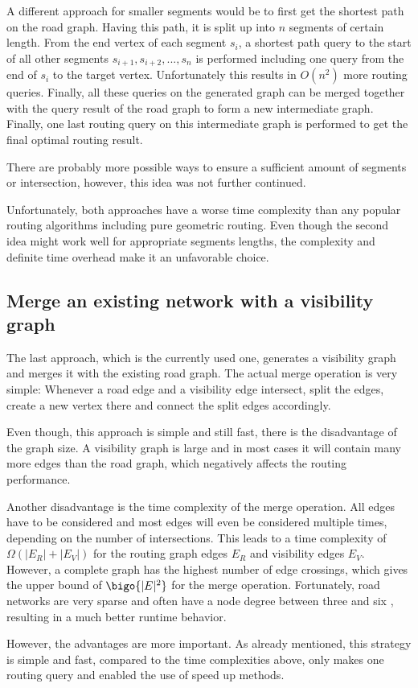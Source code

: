 		A different approach for smaller segments would be to first get the shortest path on the road graph.
		Having this path, it is split up into $n$ segments of certain length.
		From the end vertex of each segment $s_i$, a shortest path query to the start of all other segments $s_{i+1}, s_{i+2}, ..., s_n$ is performed including one query from the end of $s_i$ to the target vertex.
		Unfortunately this results in $O(n^2)$ more routing queries.
		Finally, all these queries on the generated graph can be merged together with the query result of the road graph to form a new intermediate graph.
		Finally, one last routing query on this intermediate graph is performed to get the final optimal routing result.
		
		There are probably more possible ways to ensure a sufficient amount of segments or intersection, however, this idea was not further continued.
		
		Unfortunately, both approaches have a worse time complexity than any popular routing algorithms including pure geometric routing.
		Even though the second idea might work well for appropriate segments lengths, the complexity and definite time overhead make it an unfavorable choice.
	
	\subsection{Merge an existing network with a visibility graph}
	
		The last approach, which is the currently used one, generates a visibility graph and merges it with the existing road graph.
		The actual merge operation is very simple:
		Whenever a road edge and a visibility edge intersect, split the edges, create a new vertex there and connect the split edges accordingly.
		
		Even though, this approach is simple and still fast, there is the disadvantage of the graph size.
		A visibility graph is large and in most cases it will contain many more edges than the road graph, which negatively affects the routing performance.
		
		Another disadvantage is the time complexity of the merge operation.
		All edges have to be considered and most edges will even be considered multiple times, depending on the number of intersections.
		This leads to a time complexity of $\Omega(|E_R| + |E_V|)$ for the routing graph edges $E_R$ and visibility edges $E_V$.
		However, a complete graph has the highest number of edge crossings, which gives the upper bound of $\bigo{|E|^2}$ for the merge operation.
		Fortunately, road networks are very sparse and often have a node degree between three and six \cite{zhao-analysis-osm-bejing}\cite{boeing-osmnx}, resulting in a much better runtime behavior.
		
		However, the advantages are more important.
		As already mentioned, this strategy is simple and fast, compared to the time complexities above, only makes one routing query and enabled the use of speed up methods.